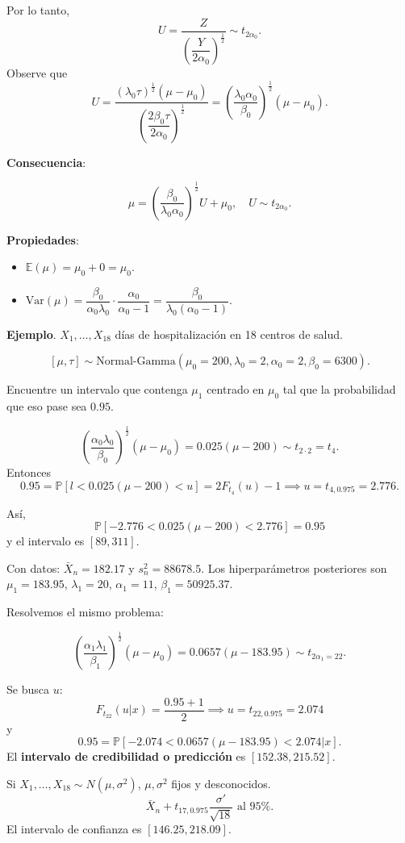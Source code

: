 \documentclass[
  12pt,
]{book}
\begin{document}
Por lo tanto,
\[U = \dfrac Z{\left( \dfrac Y{2\alpha_0}\right)^{\frac 12}}\sim t_{2\alpha_0}.\]
Observe que
\[U = \dfrac{(\lambda_0\tau)^{\frac 12}(\mu-\mu_0)}{\left( \dfrac {2\beta_0\tau}{2\alpha_0}\right)^{\frac 12}} =\left(\dfrac{\lambda_0\alpha_0}{\beta_0}\right)^{\frac 12}(\mu-\mu_0). \]

\textbf{Consecuencia}:

\[\mu =\left(\dfrac{\beta_0}{\lambda_0\alpha_0}\right)^{\frac 12} U+\mu_0,\quad U\sim t_{2\alpha_0}.\]

\textbf{Propiedades}:

\begin{itemize}
\item
  \(\mathbb E(\mu) = \mu_0 + 0 = \mu_0\).
\item
  \(\text{Var}(\mu) = \dfrac{\beta_0}{\alpha_0\lambda_0}\cdot \dfrac{\alpha_0}{\alpha_0-1} = \dfrac{\beta_0}{\lambda_0(\alpha_0-1)}\).
\end{itemize}

\textbf{Ejemplo}. \(X_1,\dots,X_{18}\) días de hospitalización en 18 centros de salud.

\[[\mu,\tau]\sim \text{Normal-Gamma}(\mu_0=200,\lambda_0=2,\alpha_0=2,\beta_0=6300).\]

Encuentre un intervalo que contenga \(\mu_1\) centrado en \(\mu_0\) tal que la probabilidad que eso pase sea \(0.95\).

\[\left(\dfrac{\alpha_0\lambda_0}{\beta_0}\right)^{\frac 12}(\mu-\mu_0) = 0.025(\mu - 200)\sim t_{2\cdot2} = t_4.\]
Entonces
\[0.95 = \mathbb P[l<0.025(\mu-200)<u] = 2F_{t_4}(u)-1 \implies u = t_{4,0.975} = 2.776.\]

Así,
\[\mathbb P[-2.776<0.025(\mu-200)<2.776]=0.95\]
y el intervalo es \([89,311]\).

Con datos: \(\bar X_n = 182.17\) y \(s_n^2 = 88678.5\). Los hiperparámetros posteriores son \(\mu_1 = 183.95\), \(\lambda_1 = 20\), \(\alpha_1 = 11\), \(\beta_1 = 50925.37\).

Resolvemos el mismo problema:

\[\left(\dfrac{\alpha_1\lambda_1}{\beta_1}\right)^{\frac 12}(\mu-\mu_0) = 0.0657(\mu - 183.95)\sim t_{2\alpha_1=22}.\]

Se busca \(u\):
\[F_{t_{22}}(u|x) = \dfrac{0.95+1}{2} \implies u = t_{22,0.975}=2.074\]
y
\[0.95 = \mathbb P[-2.074<0.0657(\mu-183.95)<2.074|x].\]
El \textbf{intervalo de credibilidad o predicción} es \([152.38,215.52]\).

Si \(X_1,\dots,X_{18}\sim N(\mu,\sigma^2)\), \(\mu,\sigma^2\) fijos y desconocidos.
\[\bar X_n+t_{17,0.975}\dfrac{\sigma'}{\sqrt {18}} \text{ al }95\%.\]
El intervalo de confianza es \([146.25,218.09]\).
\end{document}
